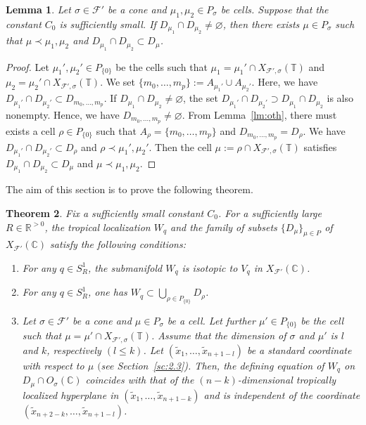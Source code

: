 \documentclass[10pt,a4paper]{amsart}
\numberwithin{equation}{section}
\newtheorem{Theorem}{Theorem}[section]
\newtheorem{Lemma}[Theorem]{Lemma}
\begin{document}
\begin{Lemma}\label{lm:usig}
Let $\sigma \in {\mathcal F}'$ be a cone and $\mu_1, \mu_2 \in P_\sigma$ be cells.
Suppose that the constant $C_0$ is sufficiently small.
If $D_{\mu_1} \cap D_{\mu_2} \neq \varnothing$, then there exists $\mu \in P_\sigma$ such that $\mu \prec \mu_1, \mu_2$ and $D_{\mu_1} \cap D_{\mu_2} \subset D_\mu$.
\end{Lemma}
\begin{proof}
Let $\mu_1', \mu_2' \in P_{\{0\}}$ be the cells such that
$\mu_1=\mu_1' \cap X_{{\mathcal F}',\sigma}({\mathbb T})$ and $\mu_2=\mu_2' \cap X_{{\mathcal F}',\sigma}({\mathbb T})$.
We set $\{m_0, \dots, m_{p}\}:=A_{\mu_1'} \cup A_{\mu_2'}$.
Here, we have $D_{\mu_1'} \cap D_{\mu_2'} \subset D_{m_0, \dots, m_p}$.
If $D_{\mu_1} \cap D_{\mu_2} \neq \varnothing$, the set $D_{\mu_1'} \cap D_{\mu_2'} \supset D_{\mu_1} \cap D_{\mu_2}$ is also nonempty.
Hence, we have $D_{m_0, \dots, m_p} \neq \varnothing$.
From Lemma~\ref{lm:oth}, there must exists a cell $\rho \in P_{\{0\}}$ such that $A_\rho=\{m_0, \dots, m_p\}$ and $D_{m_0, \dots, m_p}=D_\rho$.
We have $D_{\mu_1'} \cap D_{\mu_2'} \subset D_\rho$ and $\rho \prec \mu_1', \mu_2'$.
Then the cell $\mu:=\rho \cap X_{{\mathcal F}',\sigma}({\mathbb T})$ satisf\/ies $D_{\mu_1} \cap D_{\mu_2} \subset D_\mu$ and $\mu \prec \mu_1, \mu_2$.
\end{proof}

The aim of this section is to prove the following theorem.

\begin{Theorem}\label{th:sub}
Fix a sufficiently small constant $C_0$.
For a sufficiently large $R \in {\mathbb R}^{>0}$, the tropical localization $W_q$ and the family of subsets $\{D_\mu\}_{\mu \in P}$ of $X_{{\mathcal F}'}({\mathbb C})$ satisfy the following conditions:
\begin{enumerate}\itemsep=0pt
\item[$1.$] For any $q \in S_R^1$, the submanifold $W_q$ is isotopic to $V_q$ in $X_{{\mathcal F}'}({\mathbb C})$.%
\item[$2.$] For any $q \in S_R^1$, one has $W_q \subset \bigcup_{\rho \in P_{\{0\}}} D_\rho$.%
\item[$3.$] Let $\sigma \in {\mathcal F}'$ be a cone and $\mu \in P_\sigma$ be a cell.
Let further $\mu' \in P_{\{0\}}$ be the cell such that $\mu = \mu' \cap X_{{\mathcal F}',\sigma}({\mathbb T})$.
Assume that the dimension of $\sigma$ and $\mu'$ is $l$ and $k$, respectively $(l \leq k)$.
Let $(\tilde{x}_1, \dots, \tilde{x}_{n+1-l})$ be a standard coordinate with respect to $\mu$ $($see Section~{\rm \ref{sc:2.3})}.
Then, the defining equation of $W_q$ on $D_\mu \cap O_\sigma({\mathbb C})$ coincides with that of the $(n-k)$-dimensional tropically localized hyperplane in $(\tilde{x}_1, \dots, \tilde{x}_{n+1-k})$ and is independent of the coordinate $(\tilde{x}_{n+2-k}, \dots, \tilde{x}_{n+1-l})$.%
\end{enumerate}
\end{Theorem}
\end{document}
